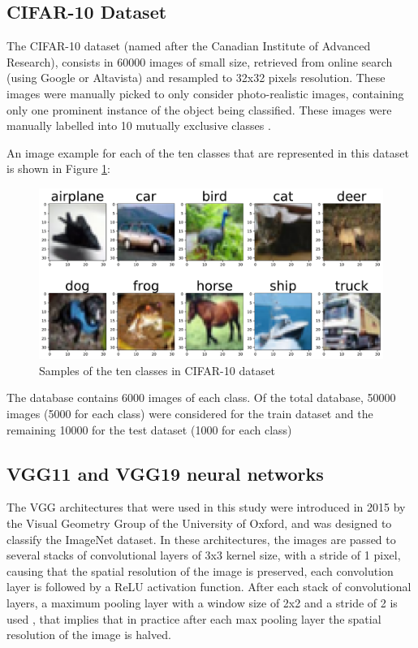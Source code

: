 \documentclass[10pt,twocolumn,letterpaper]{article}
\begin{document}
\subsection{CIFAR-10 Dataset}

The CIFAR-10 dataset (named after the Canadian Institute of Advanced Research), consists in 60000 images of small size, retrieved from online search (using Google or Altavista) and resampled to 32x32 pixels resolution. These images were manually picked to only consider photo-realistic images, containing only one prominent instance of the object being classified. These images were manually labelled into 10 mutually exclusive classes \cite{Krizhevsky2017}. 

An image example for each of the ten classes that are represented in this dataset is shown in Figure \ref{fig:samples}: 

\begin{figure}[h]
	\begin{center}
		\includegraphics[width=1.0\linewidth]{samples_images.pdf}
	\end{center}
	\caption{Samples of the ten classes in CIFAR-10 dataset}
	\label{fig:samples}
\end{figure}

The database contains 6000 images of each class. Of the total database, 50000 images (5000 for each class) were considered for the train dataset and the remaining 10000 for the test dataset (1000 for each class)

\subsection{VGG11 and VGG19 neural networks}

The VGG architectures that were used in this study were introduced in 2015 by the Visual Geometry Group of the University of Oxford, and was designed to classify the ImageNet dataset. In these architectures, the images are passed to several stacks of convolutional layers of 3x3 kernel size, with a stride of 1 pixel, causing that the spatial resolution of the image is preserved, each convolution layer is followed by a ReLU activation function. After each stack of convolutional layers, a maximum pooling layer with a window size of 2x2 and a stride of 2 is used \cite{Simonyan2015}, that implies that in practice after each max pooling layer the spatial resolution of the image is halved.
\end{document}
